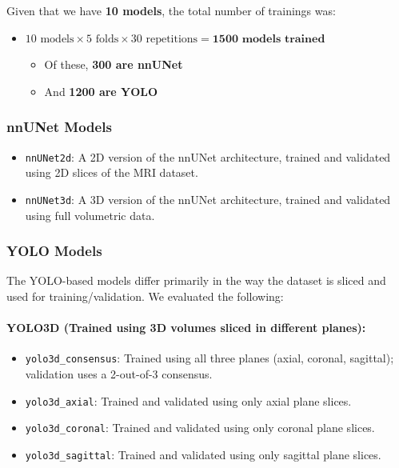 \documentclass[11pt]{article}
\providecommand{\tightlist}{%
      \setlength{\itemsep}{0pt}\setlength{\parskip}{0pt}}
\begin{document}
Given that we have \textbf{10 models}, the total number of trainings
was:

\begin{itemize}
\tightlist
\item
  \(10 \text{ models} \times 5 \text{ folds} \times 30 \text{ repetitions} = \textbf{1500 models trained}\)

  \begin{itemize}
  \tightlist
  \item
    Of these, \textbf{300 are nnUNet}
  \item
    And \textbf{1200 are YOLO}
  \end{itemize}
\end{itemize}

\subsubsection{\texorpdfstring{\textbf{nnUNet
Models}}{nnUNet Models}}\label{nnunet-models}

\begin{itemize}
\tightlist
\item
  \texttt{nnUNet2d}: A 2D version of the nnUNet architecture, trained
  and validated using 2D slices of the MRI dataset.
\item
  \texttt{nnUNet3d}: A 3D version of the nnUNet architecture, trained
  and validated using full volumetric data.
\end{itemize}

\subsubsection{\texorpdfstring{\textbf{YOLO
Models}}{YOLO Models}}\label{yolo-models}

The YOLO-based models differ primarily in the way the dataset is sliced
and used for training/validation. We evaluated the following:

\paragraph{YOLO3D (Trained using 3D volumes sliced in different
planes):}\label{yolo3d-trained-using-3d-volumes-sliced-in-different-planes}

\begin{itemize}
\tightlist
\item
  \texttt{yolo3d\_consensus}: Trained using all three planes (axial,
  coronal, sagittal); validation uses a 2-out-of-3 consensus.
\item
  \texttt{yolo3d\_axial}: Trained and validated using only axial plane
  slices.
\item
  \texttt{yolo3d\_coronal}: Trained and validated using only coronal
  plane slices.
\item
  \texttt{yolo3d\_sagittal}: Trained and validated using only sagittal
  plane slices.
\end{itemize}
\end{document}
